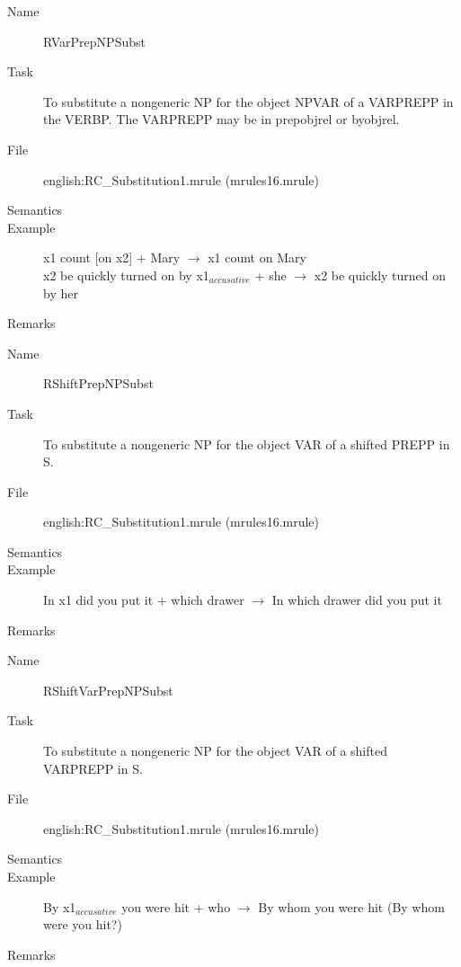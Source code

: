 \begin{description}
\vspace{1 cm}
\begin{description}
\item[Name] RVarPrepNPSubst
\item[Task] To substitute a nongeneric NP for the object NPVAR of a VARPREPP 
in the VERBP. The VARPREPP may be in prepobjrel or byobjrel.
\item[File] english:RC\_Substitution1.mrule (mrules16.mrule)
\item[Semantics]
\item[Example] x1 count [on x2] + Mary $\rightarrow$ x1 count on Mary\\
x2 be quickly turned on by x1$_{accusative}$ + she $\rightarrow$ x2 be quickly 
turned on by her
\item[Remarks] 
\end{description}

\vspace{1 cm}
\begin{description}
\item[Name] RShiftPrepNPSubst
\item[Task] To substitute a nongeneric NP for the object VAR of a shifted PREPP 
in S.
\item[File] english:RC\_Substitution1.mrule (mrules16.mrule)
\item[Semantics]
\item[Example] In x1 did you put it + which drawer $\rightarrow$ In which 
drawer did you put it
\item[Remarks]
\end{description}

\vspace{1 cm}
\begin{description}
\item[Name] RShiftVarPrepNPSubst
\item[Task] To substitute a nongeneric NP for the object VAR of a shifted 
VARPREPP in S.
\item[File] english:RC\_Substitution1.mrule (mrules16.mrule)
\item[Semantics]
\item[Example] By x1$_{accusative}$ you were hit + who $\rightarrow$ By whom 
you were hit (By whom were you hit?)
\item[Remarks]
\end{description}


\end{description}
